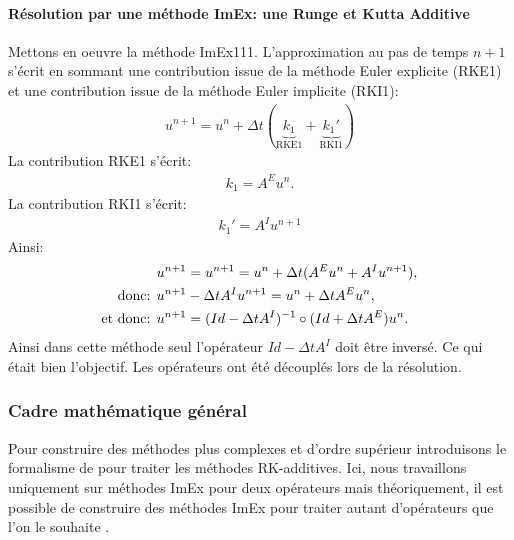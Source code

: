     \paragraph{Résolution par une méthode ImEx: une Runge et Kutta Additive}
            Mettons en oeuvre la méthode ImEx111. 
            L’approximation au pas de temps $n+1$ s'écrit en sommant une contribution issue de la méthode Euler explicite (RKE1)
            et une contribution issue de la méthode Euler implicite (RKI1):
            \begin{align}
                u^{n+1} = u^n + \Delta t (\underbrace{k_1}_{\text{RKE1}} + \underbrace{k_1'}_{\text{RKI1}})
            \end{align}
            La contribution RKE1 s'écrit:
            \begin{align}
                k_1 = A^E u^n.
            \end{align}
            La contribution RKI1 s'écrit:
            \begin{align}
                k_1' = A^I u^{n+1}
            \end{align}
            Ainsi: 
            \begin{align}
                &u^{n+1} = u^{n+1} = u^n + \Delta t ( A^E u^n +  A^I u^{n+1}),\\\notag
                \text{donc: }&u^{n+1} - \Delta t  A^I u^{n+1} = u^n + \Delta t  A^E u^n,\\\notag
                \text{et donc: }&u^{n+1} = (Id - \Delta t A^I)^{-1} \circ (Id + \Delta t A^E) u^n.
            \end{align}
            Ainsi dans cette méthode seul l’opérateur $Id- \Delta t A^I$ doit être inversé. Ce qui était bien l’objectif. Les opérateurs ont été 
            découplés lors de la résolution.
\subsubsection{Cadre mathématique général}
    Pour construire des méthodes plus complexes et d'ordre supérieur introduisons le formalisme de \cite{ASCHER1997151} pour traiter les méthodes RK-additives. 
    Ici, nous travaillons uniquement sur méthodes ImEx pour deux opérateurs mais théoriquement, il est possible de construire des méthodes ImEx pour traiter 
    autant d'opérateurs que l'on le souhaite \cite{KENNEDY2003139}.